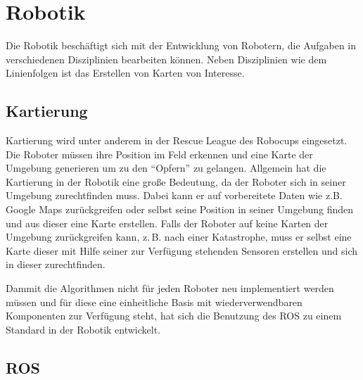 \chapter{Robotik} %
\label{cha:robotik}

Die Robotik beschäftigt sich mit der Entwicklung von Robotern, die Aufgaben in verschiedenen Disziplinien bearbeiten können. Neben Disziplinien wie dem Linienfolgen ist das Erstellen von Karten von Interesse.

\section{Kartierung} %
\label{sec:kartierung}

Kartierung wird unter anderem in der Rescue League des Robocups eingesetzt. Die Roboter müssen ihre Position im Feld erkennen und eine Karte der Umgebung generieren um zu den \enquote{Opfern} zu gelangen. Allgemein hat die Kartierung in der Robotik eine große Bedeutung, da der Roboter sich in seiner Umgebung zurechtfinden muss. Dabei kann er auf vorbereitete Daten wie z.B. Google Maps zurückgreifen oder selbst seine Position in seiner Umgebung finden und aus dieser eine Karte erstellen. Falls der Roboter auf keine Karten der Umgebung zurückgreifen kann, z.\,B. nach einer Katastrophe, muss er selbst eine Karte dieser mit Hilfe seiner zur Verfügung stehenden Sensoren erstellen und sich in dieser zurechtfinden.\par
Dammit die Algorithmen nicht für jeden Roboter neu implementiert werden müssen und für diese eine einheitliche Basis mit wiederverwendbaren Komponenten zur Verfügung steht, hat sich die Benutzung des \ac{ROS} zu einem Standard in der Robotik entwickelt.


\section{ROS} %
\label{sec:ros}

